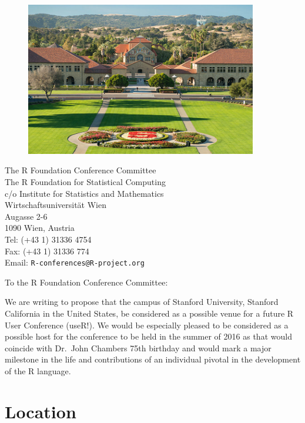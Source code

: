 \documentclass[11pt]{article}
\begin{document}
\begin{figure}[ht]
  \centering
  \includegraphics[width=0.9\textwidth]{fig/su}
  \label{fig:su}
\end{figure}

\begin{flushleft}
  The R Foundation Conference Committee\\
  The R Foundation for Statistical Computing\\
  c/o Institute for Statistics and Mathematics\\
  Wirtschaftsuniversit\"{a}t Wien\\
  Augasse 2-6\\
  1090 Wien, Austria\\
  Tel: (+43 1) 31336 4754\\
  Fax: (+43 1) 31336 774\\
  Email: \texttt{R-conferences@R-project.org}
\end{flushleft}


\date{\today}

\noindent To the R Foundation Conference Committee:

We are writing to propose that the campus of Stanford University,
Stanford California in the United States, be considered as a possible
venue for a future R User Conference (useR!). We would be especially
pleased to be considered as a possible host for the conference to be
held in the summer of 2016 as that would coincide with Dr.~John
Chambers 75th birthday and would mark a major milestone in the life
and contributions of an individual pivotal in the development of the R
language.


\section*{Location}
\end{document}
